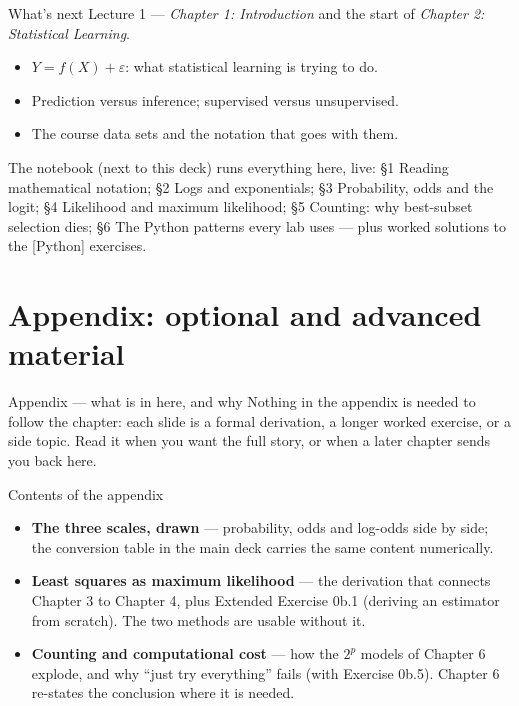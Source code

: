\documentclass[aspectratio=169,11pt]{beamer}
\begin{document}
\begin{frame}{What's next}
  Lecture 1 --- \emph{Chapter 1: Introduction} and the start of
  \emph{Chapter 2: Statistical Learning}.
  \begin{itemize}
    \item $Y = f(X) + \varepsilon$: what statistical learning is trying to do.
    \item Prediction versus inference; supervised versus unsupervised.
    \item The course data sets and the notation that goes with them.
  \end{itemize}
  \begin{labnote}
    The notebook (next to this deck) runs everything here, live:
    \S1 Reading mathematical notation; \S2 Logs and exponentials;
    \S3 Probability, odds and the logit; \S4 Likelihood and maximum likelihood;
    \S5 Counting: why best-subset selection dies; \S6 The Python patterns
    every lab uses --- plus worked solutions to the [Python] exercises.
  \end{labnote}
\end{frame}


\appendix
\AtBeginSection[]{}
\section{Appendix: optional and advanced material}

\begin{frame}{Appendix --- what is in here, and why}
  \small
  Nothing in the appendix is needed to follow the chapter: each slide is a
  formal derivation, a longer worked exercise, or a side topic. Read it when
  you want the full story, or when a later chapter sends you back here.
  \begin{block}{Contents of the appendix}
    \begin{itemize}
      \item \textbf{The three scales, drawn} --- probability, odds and log-odds side by side; the conversion table in the main deck carries the same content numerically.
      \item \textbf{Least squares as maximum likelihood} --- the derivation that connects Chapter 3 to Chapter 4, plus Extended Exercise 0b.1 (deriving an estimator from scratch). The two methods are usable without it.
      \item \textbf{Counting and computational cost} --- how the $2^p$ models of Chapter 6 explode, and why ``just try everything'' fails (with Exercise 0b.5). Chapter 6 re-states the conclusion where it is needed.
    \end{itemize}
  \end{block}
\end{frame}
\end{document}
